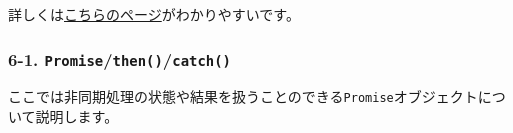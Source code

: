 詳しくは\href{https://jsprimer.net/basic/async/}{こちらのページ}がわかりやすいです。

\subsubsection{\texorpdfstring{6-1.
\texttt{Promise}/\texttt{then()}/\texttt{catch()}}{6-1. Promise/then()/catch()}}\label{promisethencatch}

ここでは非同期処理の状態や結果を扱うことのできる\texttt{Promise}オブジェクトについて説明します。

\begin{Shaded}
\begin{Highlighting}[]
\OperatorTok{=}\NormalTok{ () }\KeywordTok{=\textgreater{}}  \OperatorTok{,}\KeywordTok{=\textgreater{}}\NormalTok{ \{}
  \OperatorTok{=} \NormalTok{(}\NormalTok{() }\OperatorTok{*} \NormalTok{)}\OperatorTok{;}
  \NormalTok{(() }\KeywordTok{=\textgreater{}}\NormalTok{ \{}
    \OperatorTok{\%}  \OperatorTok{===} \NormalTok{) \{}
      \NormalTok{(}\VerbatimStringTok{\textasciigrave{}}\SpecialCharTok{$\{}\SpecialCharTok{\}}\NormalTok{)}\OperatorTok{;}
\NormalTok{    \} }\NormalTok{ \{}
      \NormalTok{(}\VerbatimStringTok{\textasciigrave{}}\SpecialCharTok{$\{}\SpecialCharTok{\}}\NormalTok{)}
\NormalTok{    \}}
\NormalTok{  \}}\OperatorTok{,}\OperatorTok{;}
\NormalTok{\})}\OperatorTok{;}

\NormalTok{()}
  \KeywordTok{=\textgreater{}} \NormalTok{(}\SpecialCharTok{$\{}\SpecialCharTok{\}}\VerbatimStringTok{\textasciigrave{}}\NormalTok{))}
  \KeywordTok{=\textgreater{}} \NormalTok{(}\SpecialCharTok{$\{}\SpecialCharTok{\}}\VerbatimStringTok{\textasciigrave{}}\NormalTok{))}\OperatorTok{;}
\end{Highlighting}
\end{Shaded}


